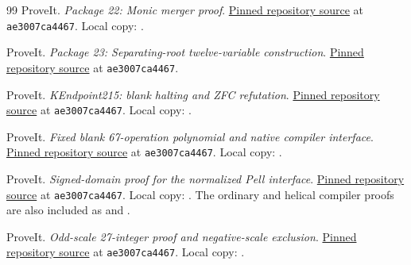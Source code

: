 \documentclass[11pt,letterpaper]{article}
\theoremstyle{remark}
\begin{document}
\begin{thebibliography}{99}
ProveIt. \emph{Package 22: Monic merger proof}.
\href{https://github.com/VladimirReshetnikov/ProveIt/blob/ae3007ca4467011e0e051c84acb4a1dd13971b0e/SetTheory/Cardinals/docs/reports/hilbert-tenth-problem/con-zfc-diophantine-forms/22-monic12/proofs/merger_proof.md}{Pinned repository source} at \texttt{ae3007ca4467}. Local copy: .

ProveIt. \emph{Package 23: Separating-root twelve-variable construction}.
\href{https://github.com/VladimirReshetnikov/ProveIt/blob/ae3007ca4467011e0e051c84acb4a1dd13971b0e/SetTheory/Cardinals/docs/reports/hilbert-tenth-problem/con-zfc-diophantine-forms/23-separating12/README.md}{Pinned repository source} at \texttt{ae3007ca4467}.

ProveIt. \emph{KEndpoint215: blank halting and ZFC refutation}.
\href{https://github.com/VladimirReshetnikov/ProveIt/blob/ae3007ca4467011e0e051c84acb4a1dd13971b0e/Computability/BusyBeaver/Lean/BusyBeaver/ZFC/KEndpoint215.lean}{Pinned repository source} at \texttt{ae3007ca4467}. Local copy: .

ProveIt. \emph{Fixed blank 67-operation polynomial and native compiler interface}.
\href{https://github.com/VladimirReshetnikov/ProveIt/blob/ae3007ca4467011e0e051c84acb4a1dd13971b0e/SetTheory/Cardinals/docs/reports/hilbert-tenth-problem/con-zfc-diophantine-forms/21-norm12/upstream/FIXED_BLANK_67_PROOF.md}{Pinned repository source} at \texttt{ae3007ca4467}. Local copy: .

ProveIt. \emph{Signed-domain proof for the normalized Pell interface}.
\href{https://github.com/VladimirReshetnikov/ProveIt/blob/ae3007ca4467011e0e051c84acb4a1dd13971b0e/SetTheory/Cardinals/docs/reports/hilbert-tenth-problem/con-zfc-diophantine-forms/21-norm12/upstream/SIGNED_DOMAIN_29.md}{Pinned repository source} at \texttt{ae3007ca4467}. Local copy: . The ordinary and helical compiler proofs are also included as  and .

ProveIt. \emph{Odd-scale 27-integer proof and negative-scale exclusion}.
\href{https://github.com/VladimirReshetnikov/ProveIt/blob/ae3007ca4467011e0e051c84acb4a1dd13971b0e/SetTheory/Cardinals/docs/reports/hilbert-tenth-problem/con-zfc-diophantine-forms/23-separating12/proofs/ODD_SCALE_27_PROOF.md}{Pinned repository source} at \texttt{ae3007ca4467}. Local copy: .


\end{thebibliography}
\end{document}
